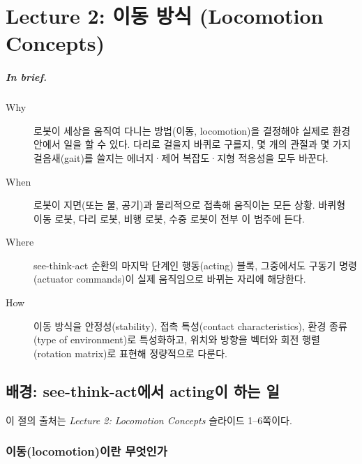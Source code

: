 \chapter{Lecture 2: 이동 방식 (Locomotion Concepts)}
\label{ch:lec02}


\paragraph{In brief.}
\begin{description}
  \item[Why] 로봇이 세상을 움직여 다니는 방법(이동, locomotion)을 결정해야 실제로
        환경 안에서 일을 할 수 있다. 다리로 걸을지 바퀴로 구를지, 몇 개의 관절과
        몇 가지 걸음새(gait)를 쓸지는 에너지·제어 복잡도·지형 적응성을 모두 바꾼다.
  \item[When] 로봇이 지면(또는 물, 공기)과 물리적으로 접촉해 움직이는 모든 상황.
        바퀴형 이동 로봇, 다리 로봇, 비행 로봇, 수중 로봇이 전부 이 범주에 든다.
  \item[Where] see-think-act 순환의 마지막 단계인 행동(acting) 블록, 그중에서도
        구동기 명령(actuator commands)이 실제 움직임으로 바뀌는 자리에 해당한다.
  \item[How] 이동 방식을 안정성(stability), 접촉 특성(contact characteristics),
        환경 종류(type of environment)로 특성화하고, 위치와 방향을 벡터와 회전
        행렬(rotation matrix)로 표현해 정량적으로 다룬다.
\end{description}

\section{배경: see-think-act에서 acting이 하는 일}
\label{sec:lec02-bg}

이 절의 출처는 \emph{Lecture 2: Locomotion Concepts} 슬라이드 1--6쪽이다.

\subsection{이동(locomotion)이란 무엇인가}
\label{sec:lec02-bg-def}


